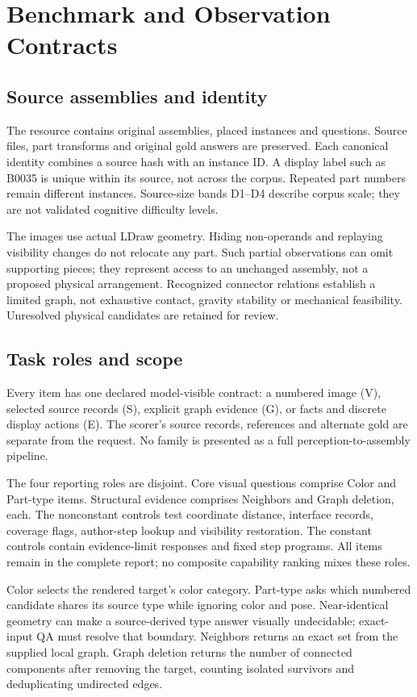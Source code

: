 \documentclass[10pt,twocolumn,letterpaper]{article}
\begin{document}
\section{Benchmark and Observation Contracts}
\subsection{Source assemblies and identity}
The resource contains \EvSources{} original assemblies,
\EvParts{} placed instances and \EvTasks{} questions. Source files,
part transforms and original gold answers are preserved. Each canonical
identity combines a source hash with an instance ID. A display label
such as B0035 is unique within its source, not across the corpus.
Repeated part numbers remain different instances. Source-size bands
D1--D4 describe corpus scale; they are not validated cognitive
difficulty levels.

The images use actual LDraw geometry. Hiding non-operands and replaying
visibility changes do not relocate any part. Such partial observations
can omit supporting pieces; they represent access to an unchanged
assembly, not a proposed physical arrangement. Recognized connector
relations establish a limited graph, not exhaustive contact, gravity
stability or mechanical feasibility. Unresolved physical candidates
are retained for review.

\subsection{Task roles and scope}
Every item has one declared model-visible contract: a numbered image
(V), selected source records (S), explicit graph evidence (G), or
facts and discrete display actions (E). The scorer's source records,
references and alternate gold are separate from the request.
No family is presented as a full perception-to-assembly pipeline.

The four reporting roles are disjoint. Core visual questions comprise
\EvColorN{} Color and \EvTypeN{} Part-type items. Structural evidence
comprises Neighbors and Graph deletion, \EvGraphN{} each. The
\EvControls{} nonconstant controls test coordinate distance, interface
records, coverage flags, author-step lookup and visibility restoration.
The \EvConstant{} constant controls contain \EvLimitN{} evidence-limit
responses and \EvStepN{} fixed step programs. All items remain in the
complete report; no composite capability ranking mixes these roles.

Color selects the rendered target's color category. Part-type asks
which numbered candidate shares its source type while ignoring color
and pose. Near-identical geometry can make a source-derived type answer
visually undecidable; exact-input QA must resolve that boundary.
Neighbors returns an exact set from the supplied local graph.
Graph deletion returns the number of connected components after
removing the target, counting isolated survivors and deduplicating
undirected edges.
\end{document}
